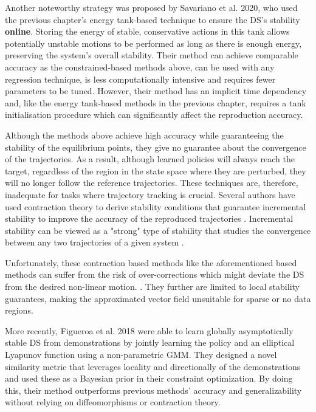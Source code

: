 Another noteworthy strategy was proposed by Savariano et al. 2020\cite{saver}, who used the previous chapter's energy tank-based technique to ensure the DS's stability \textbf{online}. Storing the energy of stable, conservative actions in this tank allows potentially unstable motions to be performed as long as there is enough energy, preserving the system's overall stability. Their method can achieve comparable accuracy as the constrained-based methods above, can be used with any regression technique, is less computationally intensive and requires fewer parameters to be tuned. However, their method has an implicit time dependency and, like the energy tank-based methods in the previous chapter, requires a tank initialisation procedure which can significantly affect the reproduction accuracy.

Although the methods above achieve high accuracy while guaranteeing the stability of the equilibrium points, they give no guarantee about the convergence of the trajectories. As a result, although learned policies will always reach the target, regardless of the region in the state space where they are perturbed, they will no longer follow the reference trajectories. These techniques are, therefore, inadequate for tasks where trajectory tracking is crucial. Several authors have used contraction theory to derive stability conditions that guarantee incremental stability to improve the accuracy of the reproduced trajectories \cite{blocherLearningStableDynamical2017}. Incremental stability can be viewed as a "strong" type of stability that studies the convergence between any two trajectories of a given system \cite{lohmillerContractionAnalysisNonlinear1998}.

Unfortunately, these contraction based methods like the aforementioned based methods can suffer from the risk of over-corrections which might deviate the DS from the desired non-linear motion. \cite{figueroafernandezPhysicallyconsistentBayesianNonparametric2018}. They further are limited to local stability guarantees, making the approximated vector field unsuitable for sparse or no data regions.

More recently, Figueroa et al. 2018 \cite{figueroafernandezPhysicallyconsistentBayesianNonparametric2018} were able to learn globally asymptotically stable DS from demonstrations by jointly learning the policy and an elliptical Lyapunov function using a non-parametric GMM. They designed a novel similarity metric that leverages locality and directionally of the demonstrations and used these as a Bayesian prior in their constraint optimization. By doing this, their method outperforms previous methods' accuracy and generalizability without relying on diffeomorphisms or contraction theory.

